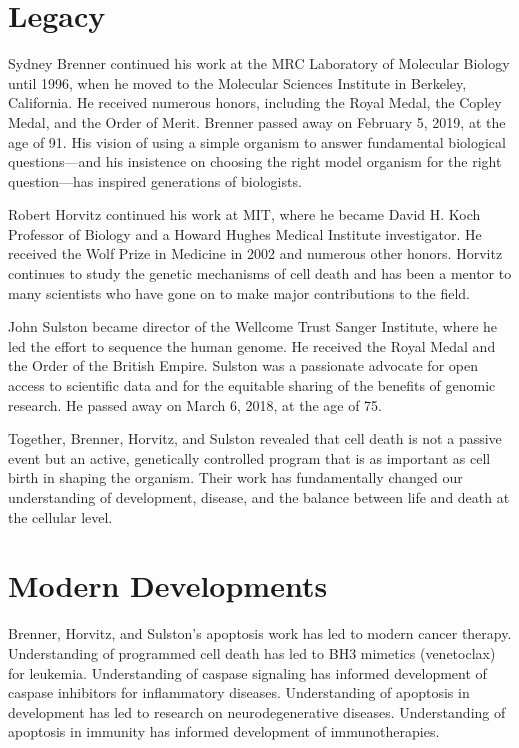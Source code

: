 \section{Legacy}

Sydney Brenner continued his work at the MRC Laboratory of Molecular Biology until 1996, when he moved to the Molecular Sciences Institute in Berkeley, California. He received numerous honors, including the Royal Medal, the Copley Medal, and the Order of Merit. Brenner passed away on February 5, 2019, at the age of 91. His vision of using a simple organism to answer fundamental biological questions---and his insistence on choosing the right model organism for the right question---has inspired generations of biologists.

Robert Horvitz continued his work at MIT, where he became David H. Koch Professor of Biology and a Howard Hughes Medical Institute investigator. He received the Wolf Prize in Medicine in 2002 and numerous other honors. Horvitz continues to study the genetic mechanisms of cell death and has been a mentor to many scientists who have gone on to make major contributions to the field.

John Sulston became director of the Wellcome Trust Sanger Institute, where he led the effort to sequence the human genome. He received the Royal Medal and the Order of the British Empire. Sulston was a passionate advocate for open access to scientific data and for the equitable sharing of the benefits of genomic research. He passed away on March 6, 2018, at the age of 75.

Together, Brenner, Horvitz, and Sulston revealed that cell death is not a passive event but an active, genetically controlled program that is as important as cell birth in shaping the organism. Their work has fundamentally changed our understanding of development, disease, and the balance between life and death at the cellular level.


\section{Modern Developments}

Brenner, Horvitz, and Sulston's apoptosis work has led to modern cancer therapy. Understanding of programmed cell death has led to BH3 mimetics (venetoclax) for leukemia. Understanding of caspase signaling has informed development of caspase inhibitors for inflammatory diseases. Understanding of apoptosis in development has led to research on neurodegenerative diseases. Understanding of apoptosis in immunity has informed development of immunotherapies.


